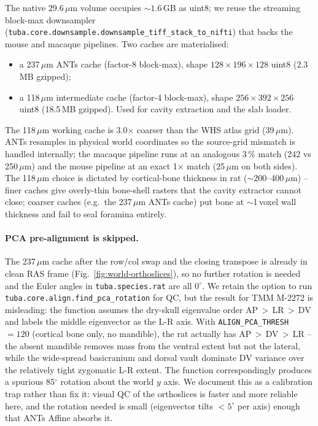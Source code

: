 \documentclass{compactarticle}
\begin{document}
The native 29.6\,$\mu$m volume occupies ${\sim}1.6$\,GB as uint8; we
reuse the streaming block-max downsampler
(\texttt{tuba.core.downsample.\allowbreak downsample\_tiff\_stack\_to\_nifti})
that backs the mouse and macaque pipelines. Two caches are
materialised:
\begin{itemize}[leftmargin=*]
\setlength\itemsep{0pt}
  \item a 237\,$\mu$m ANTs cache (factor-8 block-max), shape
        $128 \times 196 \times 128$ uint8 (2.3\,MB gzipped);
  \item a 118\,$\mu$m intermediate cache (factor-4 block-max), shape
        $256 \times 392 \times 256$ uint8 (18.5\,MB gzipped). Used
        for cavity extraction and the slab loader.
\end{itemize}

The 118\,$\mu$m working cache is 3.0$\times$ coarser than the WHS
atlas grid (39\,$\mu$m). ANTs resamples in physical world coordinates
so the source-grid mismatch is handled internally; the macaque
pipeline runs at an analogous 3\,\% match (242 vs 250\,$\mu$m) and
the mouse pipeline at an exact 1$\times$ match (25\,$\mu$m on both
sides). The 118\,$\mu$m choice is dictated by cortical-bone
thickness in rat ($\sim$200--400\,$\mu$m) -- finer caches give
overly-thin bone-shell rasters that the cavity extractor cannot
close; coarser caches (e.g.\ the 237\,$\mu$m ANTs cache) put bone at
$\sim$1\,voxel wall thickness and fail to seal foramina entirely.

\paragraph{PCA pre-alignment is skipped.}
The 237\,$\mu$m cache after the row/col swap and the closing
transpose is already in clean RAS frame (Fig.~\ref{fig:world-orthoslices}),
so no further rotation is needed and the Euler angles in
\texttt{tuba.species.rat} are all $0^\circ$. We retain the option to
run \texttt{tuba.core.\allowbreak align.\allowbreak find\_pca\_rotation}
for QC, but the result for TMM M-2272 is misleading: the function
assumes the dry-skull eigenvalue order
AP\,$>$\,LR\,$>$\,DV and labels the middle eigenvector as the L-R
axis. With \texttt{ALIGN\_PCA\_THRESH}\,$=120$ (cortical bone only,
no mandible), the rat actually has AP\,$>$\,DV\,$>$\,LR -- the
absent mandible removes mass from the ventral extent but not the
lateral, while the wide-spread basicranium and dorsal vault dominate
DV variance over the relatively tight zygomatic L-R extent. The
function correspondingly produces a spurious 85$^\circ$ rotation
about the world $y$ axis. We document this as a calibration trap
rather than fix it: visual QC of the orthoslices is faster and more
reliable here, and the rotation needed is small (eigenvector tilts
$<5^\circ$ per axis) enough that ANTs Affine absorbs it.
\end{document}
